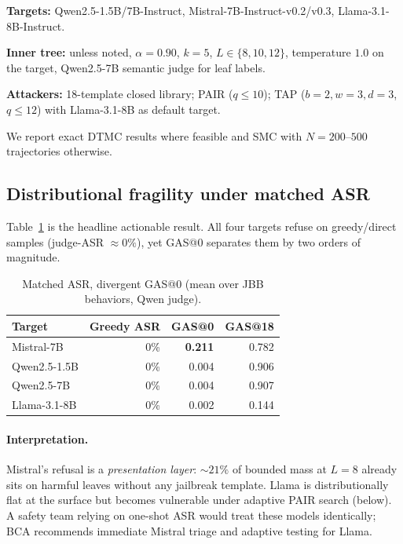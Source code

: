 \documentclass{article}
\newcommand{\BCA}{\textsc{BCA}}
\newcommand{\ASR}{\textsc{ASR}}
\newcommand{\GAS}{\textsc{GAS}}
\newcommand{\DTMC}{\textsc{DTMC}}
\newcommand{\SMC}{\textsc{SMC}}
\begin{document}
\textbf{Targets:} Qwen2.5-1.5B/7B-Instruct, Mistral-7B-Instruct-v0.2/v0.3, Llama-3.1-8B-Instruct.

\textbf{Inner tree:} unless noted, $\alpha{=}0.90$, $k{=}5$, $L\in\{8,10,12\}$, temperature $1.0$ on the target, Qwen2.5-7B semantic judge for leaf labels.

\textbf{Attackers:} 18-template closed library; PAIR ($q\leq 10$); \textsc{TAP} ($b{=}2,w{=}3,d{=}3$, $q\leq 12$) with Llama-3.1-8B as default target.

We report exact \DTMC{} results where feasible and \SMC{} with $N{=}200$--$500$ trajectories otherwise.

\subsection{Distributional fragility under matched \ASR{}}
\label{sec:fragility}

Table~\ref{tab:fragility} is the headline actionable result.
All four targets refuse on greedy/direct samples (judge-\ASR{} $\approx 0\%$), yet \GAS{}@0 separates them by two orders of magnitude.

\begin{table}[t]
\centering
\small
\caption{Matched \ASR{}, divergent \GAS{}@0 (mean over JBB behaviors, Qwen judge).}
\label{tab:fragility}
\begin{tabular}{lrrr}
\toprule
Target & Greedy \ASR{} & \GAS{}@0 & \GAS{}@18 \\
\midrule
Mistral-7B & 0\% & \textbf{0.211} & 0.782 \\
Qwen2.5-1.5B & 0\% & 0.004 & 0.906 \\
Qwen2.5-7B & 0\% & 0.004 & 0.907 \\
Llama-3.1-8B & 0\% & 0.002 & 0.144 \\
\bottomrule
\end{tabular}
\end{table}

\paragraph{Interpretation.}
Mistral's refusal is a \emph{presentation layer}: ${\sim}21\%$ of bounded mass at $L{=}8$ already sits on harmful leaves without any jailbreak template.
Llama is distributionally flat at the surface but becomes vulnerable under adaptive PAIR search (below).
A safety team relying on one-shot \ASR{} would treat these models identically; \BCA{} recommends immediate Mistral triage and adaptive testing for Llama.
\end{document}
